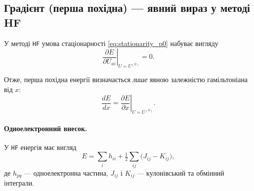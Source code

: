 %
%
%

\subsection{Градієнт (перша похідна) — явний вираз у методі HF}

У методі \texttt{HF} умова стаціонарності \eqref{eq:stationarity_p0} набуває вигляду
\[
	\left.\frac{\partial E}{\partial U_{ai}}\right|_{U=U^{(0)}} = 0.
\]

Отже, перша похідна енергії визначається \emph{лише} явною залежністю
гамільтоніана від $x$:
\begin{equation}\label{eq:HF_gradient_basic}
	\frac{dE}{dx}
	=
	\left.\frac{\partial E}{\partial x}\right|_{U=U^{(0)}} .
\end{equation}

\paragraph{Одноелектронний внесок.}
У \texttt{HF} енергія має вигляд
\[
	E = \sum_i h_{ii} + \tfrac{1}{2}\sum_{ij}\big( J_{ij} - K_{ij} \big),
\]
де $h_{pq}$ --- одноелектронна частина, $J_{ij}$ і $K_{ij}$ --- кулонівський
та обмінний інтеграли.

